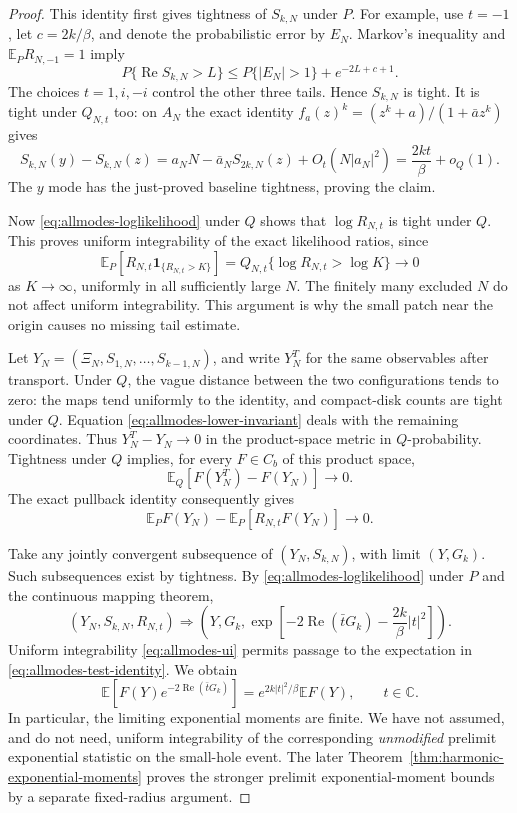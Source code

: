 \documentclass[11pt,a4paper]{article}
\numberwithin{equation}{section}
\theoremstyle{definition}
\theoremstyle{remark}
\begin{document}
\begin{proof}
This identity first gives tightness of $S_{k,N}$ under $P$. For example,
use $t=-1$, let $c=2k/\beta$, and denote the probabilistic error by $E_N$.
Markov's inequality and $\mathbb E_PR_{N,-1}=1$ imply
\[
 P\{\operatorname{Re}S_{k,N}>L\}
 \le P\{|E_N|>1\}+e^{-2L+c+1}.
\]
The choices $t=1,i,-i$ control the other three tails. Hence $S_{k,N}$
is tight. It is tight under $Q_{N,t}$ too: on $A_N$ the exact identity
$f_a(z)^k=(z^k+a)/(1+\bar az^k)$ gives
\[
 S_{k,N}(y)-S_{k,N}(z)
 =a_NN-\bar a_NS_{2k,N}(z)+O_t(N|a_N|^2)
 =\frac{2kt}{\beta}+o_Q(1).
\]
The $y$ mode has the just-proved baseline tightness, proving the claim.

Now \eqref{eq:allmodes-loglikelihood} under $Q$ shows that $\log R_{N,t}$
is tight under $Q$. This proves uniform integrability of the exact
likelihood ratios, since
\begin{equation}\label{eq:allmodes-ui}
 \mathbb E_P[R_{N,t}\mathbf1_{\{R_{N,t}>K\}}]
 =Q_{N,t}\{\log R_{N,t}>\log K\}\longrightarrow0
\end{equation}
as $K\to\infty$, uniformly in all sufficiently large $N$. The finitely
many excluded $N$ do not affect uniform integrability. This argument
is why the small patch near the origin causes no missing tail estimate.

Let $Y_N=(\Xi_N,S_{1,N},\ldots,S_{k-1,N})$, and write $Y_N^T$ for the same
observables after transport. Under $Q$, the vague distance between the two
configurations tends to zero: the maps tend uniformly to the identity,
and compact-disk counts are tight under $Q$. Equation
\eqref{eq:allmodes-lower-invariant} deals with the remaining coordinates.
Thus $Y_N^T-Y_N\to0$ in the product-space metric in $Q$-probability.
Tightness under $Q$ implies, for every $F\in C_b$ of this product space,
\[
 \mathbb E_Q[F(Y_N^T)-F(Y_N)]\longrightarrow0.
\]
The exact pullback identity consequently gives
\begin{equation}\label{eq:allmodes-test-identity}
 \mathbb E_PF(Y_N)-\mathbb E_P[R_{N,t}F(Y_N)]\longrightarrow0.
\end{equation}

Take any jointly convergent subsequence of $(Y_N,S_{k,N})$, with limit
$(Y,G_k)$. Such subsequences exist by tightness. By
\eqref{eq:allmodes-loglikelihood} under $P$ and the continuous mapping
theorem,
\[
 (Y_N,S_{k,N},R_{N,t})\Rightarrow
 \left(Y,G_k,\exp\left[-2\operatorname{Re}(\bar tG_k)
                                  -\frac{2k}{\beta}|t|^2\right]\right).
\]
Uniform integrability \eqref{eq:allmodes-ui} permits passage to the
expectation in \eqref{eq:allmodes-test-identity}. We obtain
\begin{equation}\label{eq:allmodes-limit-transform}
 \mathbb E\left[F(Y)e^{-2\operatorname{Re}(\bar tG_k)}\right]
 =e^{2k|t|^2/\beta}\mathbb EF(Y),\qquad t\in\mathbb C.
\end{equation}
In particular, the limiting exponential moments are finite. We have not
assumed, and do not need, uniform integrability of the corresponding
\emph{unmodified} prelimit exponential statistic on the small-hole event.
The later Theorem~\ref{thm:harmonic-exponential-moments} proves the
stronger prelimit exponential-moment bounds by a separate fixed-radius
argument.


\end{proof}
\end{document}
